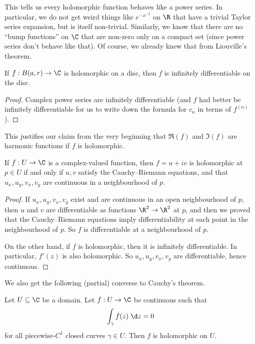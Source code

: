 \documentclass[a4paper]{article}
\begin{document}
This tells us every holomorphic function behaves like a power series. In particular, we do not get weird things like $e^{-x^{-2}}$ on $\R$ that have a trivial Taylor series expansion, but is itself non-trivial. Similarly, we know that there are no ``bump functions'' on $\C$ that are non-zero only on a compact set (since power series don't behave like that). Of course, we already knew that from Liouville's theorem.

\begin{cor}
  If $f: B(a, r) \to \C$ is holomorphic on a disc, then $f$ is infinitely differentiable on the disc.
\end{cor}

\begin{proof}
  Complex power series are infinitely differentiable (and $f$ had better be infinitely differentiable for us to write down the formula for $c_n$ in terms of $f^{(n)}$).
\end{proof}

This justifies our claim from the very beginning that $\Re(f)$ and $\Im(f)$ are harmonic functions if $f$ is holomorphic.

\begin{cor}
  If $f: U\to \C$ is a complex-valued function, then $f = u + iv$ is holomorphic at $p \in U$ if and only if $u, v$ satisfy the Cauchy--Riemann equations, and that $u_x, u_y, v_x, v_y$ are continuous in a neighbourhood of $p$.
\end{cor}

\begin{proof}
  If $u_x, u_y, v_x, v_y$ exist and are continuous in an open neighbourhood of $p$, then $u$ and $v$ are differentiable as functions $\R^2 \to \R^2$ at $p$, and then we proved that the Cauchy--Riemann equations imply differentiability at each point in the neighbourhood of $p$. So $f$ is differentiable at a neighbourhood of $p$.

  On the other hand, if $f$ is holomorphic, then it is infinitely differentiable. In particular, $f'(z)$ is also holomorphic. So $u_x, u_y, v_x, v_y$ are differentiable, hence continuous.
\end{proof}

We also get the following (partial) converse to Cauchy's theorem.
\begin{cor}
  Let $U\subseteq \C$ be a domain. Let $f:U \to \C$ be continuous such that
  \[
    \int_\gamma f(z)\;\d z = 0
  \]
  for all piecewise-$C^1$ closed curves $\gamma \in U$. Then $f$ is holomorphic on $U$.
\end{cor}
\end{document}
